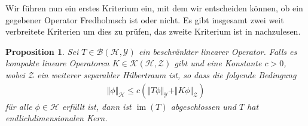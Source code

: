 \documentclass[11pt, hidelinks]{article}
\newcommand{\h}{\mathcal{H}}
\newcommand{\im}{\operatorname{im}}
\numberwithin{conj}{section}
\newtheorem{proposition}[conj]{Proposition}
\begin{document}
Wir führen nun ein erstes Kriterium ein, mit dem wir entscheiden können, ob ein gegebener Operator Fredholmsch ist oder nicht. Es gibt insgesamt zwei weit verbreitete Kriterien um dies zu prüfen, das zweite Kriterium ist in \cite[Theorem 3.4.1]{doll2023spectral} nachzulesen.

\begin{proposition}
    Sei $T \in \mathcal{B}(\h,\mathcal{Y})$ ein beschränkter linearer Operator. Falls es kompakte lineare Operatoren $K \in \mathcal{K}(\h,\mathcal{Z})$ gibt und eine Konstante $c > 0$, wobei $\mathcal{Z}$ ein weiterer separabler Hilbertraum ist, so dass die folgende Bedingung
    \begin{align}
        \Vert\phi\Vert_\h \leq c (\Vert T\phi \Vert_{\mathcal{Y}} + \Vert K\phi \Vert_{\mathcal{Z}})
    \end{align}
    für alle $\phi \in \h$ erfüllt ist, dann ist $\im(T)$ abgeschlossen und $T$ hat endlichdimensionalen Kern.
\end{proposition}
\end{document}
